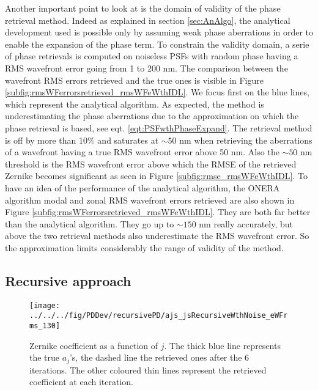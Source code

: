 Another important point to look at is the domain of validity of the phase retrieval method. Indeed as explained in section \ref{sec:AnAlgo}, the analytical development used is possible only by assuming weak phase aberrations in order to enable the expansion of the phase term. To constrain the validity domain, a serie of phase retrievals is computed on noiseless PSFs with random phase having a RMS wavefront error going from 1 to 200 nm. The comparison between the wavefront RMS errors retrieved and the true ones is visible in Figure \ref{subfig:rmsWFerrorsretrieved_rmsWFeWthIDL}. We focus first on the blue lines, which represent the analytical algorithm. As expected, the method is underestimating the phase aberrations due to the approximation on which the phase retrieval is based, see eqt. \eqref{eqt:PSFwthPhaseExpand}. The retrieval method is off by more than 10\% and saturates at $\sim 50$ nm when retrieving the aberrations of a wavefront having a true RMS wavefront error above 50 nm. Also the $\sim50$ nm threshold is the RMS wavefront error above which the RMSE of the retrieved Zernike becomes significant as seen in Figure \ref{subfig:rmse_rmsWFeWthIDL}. To have an idea of the performance of the analytical algorithm, the ONERA algorithm modal and zonal RMS wavefront errors retrieved are also shown in Figure \ref{subfig:rmsWFerrorsretrieved_rmsWFeWthIDL}. They are both far better than the analytical algorithm. They go up to $\sim150$ nm really accurately, but above the two retrieval methods also underestimate the RMS wavefront error. So the approximation limits considerably the range of validity of the method.


\subsection{Recursive approach}
\label{subsec:RecApp}

\begin{figure}
\begin{center}
\texttt{[image: ../../../fig/PDDev/recursivePD/ajs\_jsRecursiveWthNoise\_eWFrms\_130]}
\decoRule
\caption{Zernike coefficient as a function of $j$. The thick blue line represents the true $a_j$'s, the dashed line the retrieved ones after the 6 iterations. The other coloured thin lines represent the retrieved coefficient at each iteration.}
\label{fig:ajs_jsRecursiveWthNoise_eWFrms_130}
\end{center}
\end{figure}

